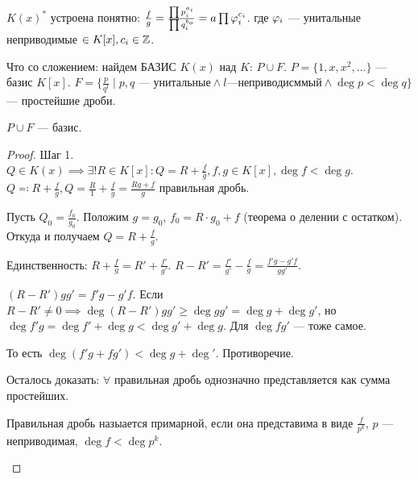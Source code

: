 $K(x)^*$ устроена понятно:  $\frac{f}{g} = \frac{\prod p_i^{a_i}}{\prod q_i^{b_o}} = a \prod \varphi_i^{c_i}$. где $\varphi_i$ --- унитальные неприводимые  $\in K[x], c_i \in \mathbb{Z}$.

Что со сложением: найдем БАЗИС  $K(x)$ над  $K$:  $P \cup F$.  $P = \{1, x, x^2, \ldots\}$ --- базис $K[x]$.  $F = \{ \frac{p}{q^l} \mid p, q\text{ --- унитальные} \land l\text{---неприводисммый} \land \deg p < \deg q\}$ --- простейшие дроби.

\begin{theorem}
    $P\cup F$ --- базис.
\end{theorem}
\begin{proof}
    Шаг 1. $Q \in K(x) \implies \exists! R \in K[x]\!: Q = R + \frac{f}{g}, f, g \in K[x], \deg f < \deg g$. $Q \eqqcolon R + \frac{f}{g},Q = \frac{R}{1} + \frac{f}{g} = \frac{Rg+f}{g}$ правильная дробь.

    Пусть $Q_0 = \frac{f_0}{g_0}$. Положим $g = g_0$, $f_0 = R \cdot g_0 +f$ (теорема о делении с остатком). Откуда и получаем $Q = R + \frac{f}{g}$. 

    Единственность: $R + \frac{f}{g} = R' + \frac{f'}{g'}$. $R - R' = \frac{f'}{g'} - \frac{f}{g} = \frac{f'g - g'f}{gg'}$.

    $(R-R')gg' = f'g - g'f$. Если  $R - R' \neq 0 \implies \deg (R-R')gg' \ge \deg gg' = \deg g + \deg g'$, но $\deg f'g = \deg f' + \deg g < \deg g' + \deg g$. Для  $\deg fg'$ --- тоже самое.

    То есть  $\deg (f'g + fg') < \deg g + \deg'$. Противоречие.

    Осталось доказать:  $\forall$ правильная дробь однозначно представляется как сумма простейших. 
     \begin{definition}
        Правильная дробь назыается примарной, если она представима в виде $\frac{f}{p^k}$, $p$ --- неприводимая,  $\deg f < \deg p^k$.
    \end{definition}
\end{proof}
